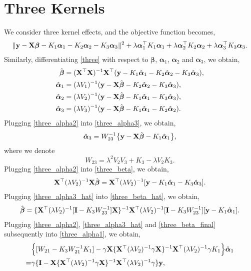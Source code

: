 \documentclass[11pt]{report}
\def\bI{{\bf I}}
\def\bX{{\bf X}}
\def\by{{\bf y}}
\def\bbeta{{\boldsymbol \beta}}
\def\balpha{{\boldsymbol \alpha}}
\begin{document}
\section{Three Kernels}
We consider three kernel effects, and the objective function becomes, 
\begin{align}
\lVert \by-\bX \bbeta -K_1 \balpha_1 -K_2 \balpha_2 -K_3 \balpha_3\rVert^2 + \lambda \balpha_1^\top K_1 \balpha_1+ \lambda \balpha_2^\top K_2 \balpha_2+ \lambda \balpha_3^\top K_3 \balpha_3. \label{three}
\end{align}
Similarly, differentiating \eqref{three} with respect to $\bbeta$, $\balpha_1$, $\balpha_2$ and $\balpha_3$, we obtain, 
\begin{align}
\hat{\bbeta}&=(\bX^\top \bX)^{-1}\bX^\top (\by-K_1 \hat{\balpha}_1-K_2 \hat{\balpha}_2-K_3 \hat{\balpha}_3),  \label{three_beta}\\
\hat{\balpha}_1&=(\lambda V_1)^{-1}(\by-\bX \hat{\bbeta}-K_2 \hat{\balpha}_2-K_3 \hat{\balpha}_3), \label{three_alpha1}\\
\hat{\balpha}_2&=(\lambda V_2)^{-1}(\by-\bX \hat{\bbeta}-K_1 \hat{\balpha}_1-K_3 \hat{\balpha}_3), \label{three_alpha2}\\
\hat{\balpha}_3&=(\lambda V_3)^{-1}(\by-\bX \hat{\bbeta}-K_1 \hat{\balpha}_1-K_2 \hat{\balpha}_2). \label{three_alpha3}
\end{align}
Plugging \eqref{three_alpha2} into \eqref{three_alpha3}, we obtain,
\begin{align}
\hat{\balpha}_3=W_{23}^{-1}\big\{\by-\bX \hat{\bbeta}-K_1 \hat{\balpha}_1\big\}, \label{three_alpha3_hat}
\end{align}
where we denote \[W_{23}=\lambda^2 V_2 V_3+K_3-\lambda V_2 K_3.\]
Plugging \eqref{three_alpha2} into \eqref{three_beta}, we obtain,
\begin{align}
\bX^\top (\lambda V_2)^{-1}\bX \hat{\bbeta}=\bX^\top (\lambda V_2)^{-1}[\by-K_1 \hat{\balpha}_1-K_3 \hat{\balpha}_3]. \label{three_beta_hat}
\end{align}
Plugging \eqref{three_alpha3_hat} into \eqref{three_beta_hat}, we obtain,
\begin{align}
\hat{\bbeta}=\{\bX^\top (\lambda V_2)^{-1}[\bI-K_3 W_{23}^{-1}]\bX \}^{-1}\bX^\top (\lambda V_2)^{-1}[\bI-K_3 W_{23}^{-1}][\by-K_1 \hat{\balpha}_1]. \label{three_beta_final}
\end{align}
Plugging \eqref{three_alpha2}, \eqref{three_alpha3_hat} and \eqref{three_beta_final} subsequently into \eqref{three_alpha1}, we obtain,
\begin{align*}
&\Big\{[W_{21}-K_3 W_{21}^{-1}K_1]-\gamma \bX \{\bX^\top (\lambda V_2)^{-1}\gamma \bX \}^{-1}\bX^\top (\lambda V_2)^{-1}\gamma K_1\Big\} \hat{\balpha}_1\\
=&\gamma \{\bI-\bX \{\bX^\top (\lambda V_2)^{-1}\gamma \bX \}^{-1}\bX^\top (\lambda V_2)^{-1}\gamma\}\by,
\end{align*}
\end{document}
